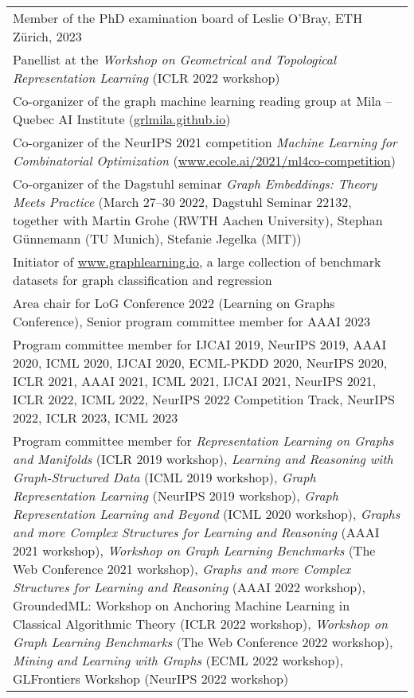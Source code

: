 \documentclass[10pt, a4paper, DIV=12, headings=small]{scrartcl}
\begin{document}
\begin{tabular}{p{14.5cm}}
	Member of the PhD examination board of Leslie O'Bray, ETH Zürich, 2023 \\[.2em]
	
	Panellist at the \emph{Workshop on Geometrical and Topological Representation Learning} (ICLR 2022 workshop) \\[0.2em]

	Co-organizer of the graph machine learning reading group at Mila -- Quebec AI Institute (\url{grlmila.github.io}) \\[1.5em]

	Co-organizer of the NeurIPS 2021 competition \emph{Machine Learning for Combinatorial Optimization} (\url{www.ecole.ai/2021/ml4co-competition}) \\[1.5em]

	Co-organizer of the Dagstuhl seminar \emph{Graph Embeddings: Theory Meets Practice} (March 27–30 2022, Dagstuhl Seminar 22132, together with Martin Grohe (RWTH Aachen University), Stephan Günnemann (TU Munich), Stefanie Jegelka (MIT)) \\[1.5em]

	Initiator of \url{www.graphlearning.io}, a large collection of benchmark datasets for graph classification and regression \\[1.5em]

	Area chair for LoG Conference 2022 (Learning on Graphs Conference), Senior program committee member for AAAI 2023 \\[1.5em]

	Program committee member for IJCAI 2019, NeurIPS  2019, AAAI 2020, ICML 2020, IJCAI 2020, ECML-PKDD 2020, NeurIPS 2020, ICLR 2021, AAAI 2021, ICML 2021, IJCAI 2021, NeurIPS 2021, ICLR 2022, ICML 2022, NeurIPS 2022 Competition Track, NeurIPS 2022, ICLR 2023, ICML 2023 \\[1.5em]

	Program committee member for \emph{Representation Learning on Graphs and Manifolds} (ICLR 2019 workshop), \emph{Learning and Reasoning with Graph-Structured Data} (ICML 2019 workshop), \emph{Graph Representation Learning} (NeurIPS 2019 workshop), \emph{Graph Representation Learning and Beyond} (ICML 2020 workshop), \emph{Graphs and more Complex Structures for Learning and Reasoning} (AAAI 2021 workshop), \emph{Workshop on Graph Learning Benchmarks} (The Web Conference 2021 workshop),  \emph{Graphs and more Complex Structures for Learning and Reasoning} (AAAI 2022 workshop), GroundedML: Workshop on Anchoring Machine Learning in Classical Algorithmic Theory (ICLR 2022 workshop), \emph{Workshop on Graph Learning Benchmarks} (The Web Conference 2022 workshop), \emph{Mining and Learning with Graphs} (ECML 2022 workshop), GLFrontiers Workshop (NeurIPS 2022 workshop) \\[1.5em]


\end{tabular}
\end{document}
